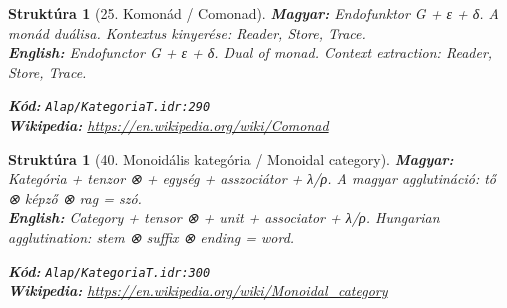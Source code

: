 \documentclass[11pt,a4paper,twocolumn]{article}
\newtheorem{struktura}[tetel]{Struktúra}
\begin{document}
\begin{struktura}[25. Komonád / Comonad]

\textbf{Magyar:} Endofunktor G + ε + δ. A monád duálisa. Kontextus kinyerése: Reader, Store, Trace.\\

\textbf{English:} Endofunctor G + ε + δ. Dual of monad. Context extraction: Reader, Store, Trace.\\

\begin{center}
\end{center}

\textbf{Kód:} \texttt{Alap/KategoriaT.idr:290}\\
\textbf{Wikipedia:} \url{https://en.wikipedia.org/wiki/Comonad}

\end{struktura}

\vspace{0.5cm}

\begin{struktura}[40. Monoidális kategória / Monoidal category]

\textbf{Magyar:} Kategória + tenzor ⊗ + egység + asszociátor + λ/ρ. A magyar agglutináció: tő ⊗ képző ⊗ rag = szó.\\

\textbf{English:} Category + tensor ⊗ + unit + associator + λ/ρ. Hungarian agglutination: stem ⊗ suffix ⊗ ending = word.\\

\begin{center}
\end{center}

\textbf{Kód:} \texttt{Alap/KategoriaT.idr:300}\\
\textbf{Wikipedia:} \url{https://en.wikipedia.org/wiki/Monoidal_category}

\end{struktura}

\vspace{0.5cm}
\end{document}
